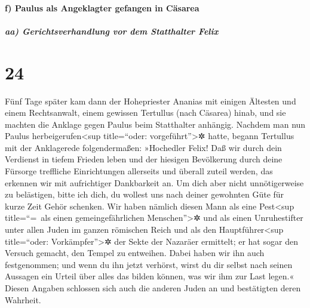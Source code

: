 \hypertarget{f-paulus-als-angeklagter-gefangen-in-cuxe4sarea}{%
\paragraph{f) Paulus als Angeklagter gefangen in
Cäsarea}\label{f-paulus-als-angeklagter-gefangen-in-cuxe4sarea}}

\hypertarget{aa-gerichtsverhandlung-vor-dem-statthalter-felix}{%
\subparagraph{aa) Gerichtsverhandlung vor dem Statthalter
Felix}\label{aa-gerichtsverhandlung-vor-dem-statthalter-felix}}

\hypertarget{section-23}{%
\section{24}\label{section-23}}

 Fünf Tage später kam dann der Hohepriester Ananias mit
einigen Ältesten und einem Rechtsanwalt, einem gewissen Tertullus (nach
Cäsarea) hinab, und sie machten die Anklage gegen Paulus beim
Statthalter anhängig.  Nachdem man nun Paulus
herbeigerufen\textless sup title=``oder: vorgeführt''\textgreater✲
hatte, begann Tertullus mit der Anklagerede folgendermaßen:
 »Hochedler Felix! Daß wir durch dein Verdienst in tiefem
Frieden leben und der hiesigen Bevölkerung durch deine Fürsorge
treffliche Einrichtungen allerseits und überall zuteil werden, das
erkennen wir mit aufrichtiger Dankbarkeit an.  Um dich
aber nicht unnötigerweise zu belästigen, bitte ich dich, du wollest uns
nach deiner gewohnten Güte für kurze Zeit Gehör schenken. 
Wir haben nämlich diesen Mann als eine Pest\textless sup title=``=~als
einen gemeingefährlichen Menschen''\textgreater✲ und als einen
Unruhestifter unter allen Juden im ganzen römischen Reich und als den
Hauptführer\textless sup title=``oder: Vorkämpfer''\textgreater✲ der
Sekte der Nazaräer ermittelt;  er hat sogar den Versuch
gemacht, den Tempel zu entweihen. Dabei haben wir ihn auch festgenommen;
 und wenn du ihn jetzt verhörst, wirst du dir selbst nach
seinen Aussagen ein Urteil über alles das bilden können, was wir ihm zur
Last legen.«  Diesen Angaben schlossen sich auch die
anderen Juden an und bestätigten deren Wahrheit.

